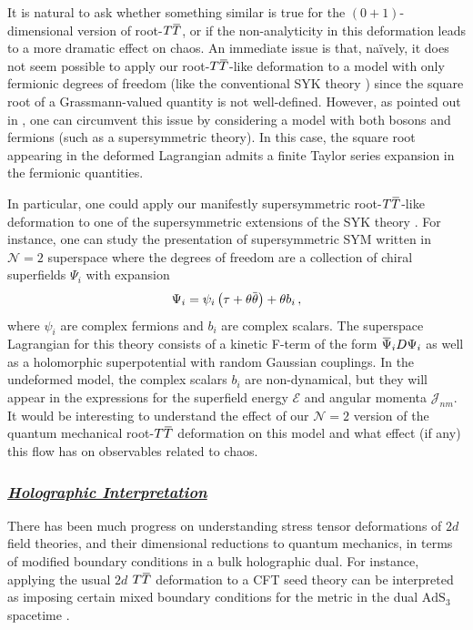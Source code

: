 \documentclass[12pt]{article}
\numberwithin{equation}{section}
\newcommand{\ul}{\underline}
\newcommand{\overbar}[1]{\mkern 1.5mu\overline{\mkern-1.5mu#1\mkern-1.5mu}\mkern 1.5mu}
\def\TT{{T\overbar{T}}}
\begin{document}
It is natural to ask whether something similar is true for the $(0+1)$-dimensional version of root-$\TT$, or if the non-analyticity in this deformation leads to a more dramatic effect on chaos. An immediate issue is that, na\"ively, it does not seem possible to apply our root-$\TT$-like deformation to a model with only fermionic degrees of freedom (like the conventional SYK theory \cite{kitaev_talk,PhysRevLett.70.3339}) since the square root of a Grassmann-valued quantity is not well-defined. However, as pointed out in \cite{Ferko:2022cix}, one can circumvent this issue by considering a model with both bosons and fermions (such as a supersymmetric theory). In this case, the square root appearing in the deformed Lagrangian admits a finite Taylor series expansion in the fermionic quantities.

In particular, one could apply our manifestly supersymmetric root-$\TT$-like deformation to one of the supersymmetric extensions of the SYK theory \cite{Fu:2016vas,Murugan:2017eto,Peng:2017spg}. For instance, one can study the presentation of supersymmetric SYM written in $\mathcal{N} = 2$ superspace \cite{Bulycheva:2018qcp} where the degrees of freedom are a collection of chiral superfields $\Psi_i$ with expansion
\begin{align}
    \Psi_i = \psi_i \left( \tau + \theta \overbar{\theta} \right) + \theta b_i \, , 
\end{align}
%
where $\psi_i$ are complex fermions and $b_i$ are complex scalars. The superspace Lagrangian for this theory consists of a kinetic F-term of the form $\overbar{\Psi}_i D \Psi_i$ as well as a holomorphic superpotential with random Gaussian couplings. In the undeformed model, the complex scalars $b_i$ are non-dynamical, but they will appear in the expressions for the superfield energy $\mathcal{E}$ and angular momenta $\mathcal{J}_{nm}$. It would be interesting to understand the effect of our $\mathcal{N} = 2$ version of the quantum mechanical root-$\TT$ deformation on this model and what effect (if any) this flow has on observables related to chaos.

\subsubsection*{\ul{\it Holographic Interpretation}}

There has been much progress on understanding stress tensor deformations of $2d$ field theories, and their dimensional reductions to quantum mechanics, in terms of modified boundary conditions in a bulk holographic dual. For instance, applying the usual $2d$ $\TT$ deformation to a CFT seed theory can be interpreted as imposing certain mixed boundary conditions for the metric in the dual $\mathrm{AdS}_3$ spacetime \cite{Guica:2019nzm}.
\end{document}

